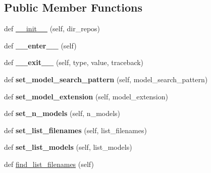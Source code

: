 \subsection*{Public Member Functions}
\begin{DoxyCompactItemize}
\item 
def \hyperlink{classasamba_1_1var__def_1_1models_a21b6a3b0d85fafe41208098a03fcf7ab}{\+\_\+\+\_\+init\+\_\+\+\_\+} (self, dir\+\_\+repos)
\item 
\mbox{\label{classasamba_1_1var__def_1_1models_afcc52884c26aac2e9aa85eecc38119b6}} 
def {\bfseries \+\_\+\+\_\+enter\+\_\+\+\_\+} (self)
\item 
\mbox{\label{classasamba_1_1var__def_1_1models_ad3911bafbf1ffbe6c7357ce0762b47c8}} 
def {\bfseries \+\_\+\+\_\+exit\+\_\+\+\_\+} (self, type, value, traceback)
\item 
\mbox{\label{classasamba_1_1var__def_1_1models_a0701c4b198d774b5a54aa378e25779f6}} 
def {\bfseries set\+\_\+model\+\_\+search\+\_\+pattern} (self, model\+\_\+search\+\_\+pattern)
\item 
\mbox{\label{classasamba_1_1var__def_1_1models_a2827d4182c5d3a85bf559daaca81bec3}} 
def {\bfseries set\+\_\+model\+\_\+extension} (self, model\+\_\+extension)
\item 
\mbox{\label{classasamba_1_1var__def_1_1models_a0f23ccd6f783e5c3e5878d6efd5a5fd5}} 
def {\bfseries set\+\_\+n\+\_\+models} (self, n\+\_\+models)
\item 
\mbox{\label{classasamba_1_1var__def_1_1models_a6d42985357f164d32ae57a6b38b267e7}} 
def {\bfseries set\+\_\+list\+\_\+filenames} (self, list\+\_\+filenames)
\item 
\mbox{\label{classasamba_1_1var__def_1_1models_af251a31d212a3f448a482d7f455e4efe}} 
def {\bfseries set\+\_\+list\+\_\+models} (self, list\+\_\+models)
\item 
def \hyperlink{classasamba_1_1var__def_1_1models_ae0babd86feff61275e38952a7cc23282}{find\+\_\+list\+\_\+filenames} (self)

\end{DoxyCompactItemize}
